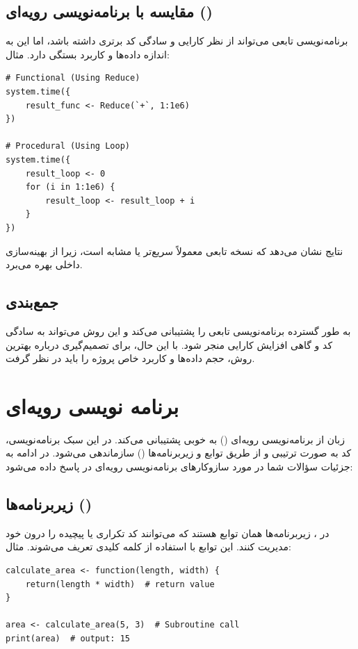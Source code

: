 \documentclass[11pt, a4paper, oneside]{book}
\begin{document}
			
		\section{مقایسه با برنامه‌نویسی رویه‌ای ()}
			
			برنامه‌نویسی تابعی می‌تواند از نظر کارایی و سادگی کد برتری داشته باشد، اما این به اندازه داده‌ها و کاربرد بستگی دارد.
			مثال:
		
			\begin{latin}
				\begin{lstlisting}[caption={\lr{Map - Filter - Reduce}}] 
# Functional (Using Reduce)
system.time({
	result_func <- Reduce(`+`, 1:1e6)
})

# Procedural (Using Loop)
system.time({
	result_loop <- 0
	for (i in 1:1e6) {
		result_loop <- result_loop + i
	}
})

				\end{lstlisting}
			\end{latin}
			
			نتایج نشان می‌دهد که نسخه تابعی معمولاً سریع‌تر یا مشابه است، زیرا از بهینه‌سازی داخلی  بهره می‌برد.
			
		
		\section{جمع‌بندی}
		
			به طور گسترده برنامه‌نویسی تابعی را پشتیبانی می‌کند و این روش می‌تواند به سادگی کد و گاهی افزایش کارایی منجر شود. با این حال، برای تصمیم‌گیری درباره بهترین روش، حجم داده‌ها و کاربرد خاص پروژه را باید در نظر گرفت.
			
			
	\chapter{برنامه نویسی رویه‌ای}
	
		زبان  از برنامه‌نویسی رویه‌ای () به خوبی پشتیبانی می‌کند. در این سبک برنامه‌نویسی، کد به صورت ترتیبی و از طریق توابع و زیربرنامه‌ها () سازماندهی می‌شود. در ادامه به جزئیات سؤالات شما در مورد سازوکارهای برنامه‌نویسی رویه‌ای در  پاسخ داده می‌شود:
		
		\section{زیربرنامه‌ها ()}
			
			در ، زیربرنامه‌ها همان توابع هستند که می‌توانند کد تکراری یا پیچیده را درون خود مدیریت کنند. این توابع با استفاده از کلمه کلیدی  تعریف می‌شوند.
			مثال:
			\begin{latin}
				\begin{lstlisting}[caption={\lr{Subroutines}}] 
calculate_area <- function(length, width) {
	return(length * width)  # return value
}

area <- calculate_area(5, 3)  # Subroutine call
print(area)  # output: 15

				\end{lstlisting}
			\end{latin}
		
\end{document}
